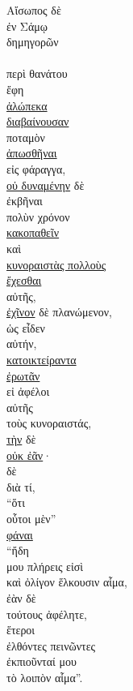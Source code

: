 {\large
\begin{greek}
\noindent Αἴσωπος δὲ \\
\tabto{2em} ἐν Σάμῳ \\
\tabto{2em} δημηγορῶν \\
 \\
\tabto{2em} περὶ θανάτου \\
ἔφη \\
\tabto{2em} \underline{ἀλώπεκα} \\
\tabto{4em} \underline{διαβαίνουσαν} \\
\tabto{6em} ποταμὸν \\
\tabto{2em} \underline{ἀπωσθῆναι} \\
\tabto{4em} εἰς φάραγγα, \\
\tabto{4em} \underline{οὐ δυναμένην} δὲ \\
\tabto{6em} ἐκβῆναι \\
\tabto{2em} πολὺν χρόνον \\
\tabto{2em} \underline{κακοπαθεῖν} \\
\tabto{2em} καὶ \\
\tabto{4em} \underline{κυνοραιστὰς πολλοὺς} \\
\tabto{2em} \underline{ἔχεσθαι} \\
\tabto{4em} αὐτῆς, \\
\tabto{2em} \underline{ἐχῖνον} δὲ πλανώμενον, \\
\tabto{4em} ὡς εἶδεν \\
\tabto{6em} αὐτήν, \\
\tabto{2em} \underline{κατοικτείραντα} \\
\tabto{2em} \underline{ἐρωτᾶν} \\
\tabto{4em} εἰ ἀφέλοι \\
\tabto{6em} αὐτῆς \\
\tabto{6em} τοὺς κυνοραιστάς, \\
\tabto{2em} \underline{τὴν} δὲ \\
\tabto{2em} \underline{οὐκ ἐᾶν}· \\
\newpage
\tabto{2em}  δὲ \\
\tabto{4em} διὰ τί, \\
\tabto{2em} ``ὅτι \\
\tabto{4em} οὗτοι μὲν'' \\
\tabto{2em} \underline{φάναι} \\
\tabto{4em} ``ἤδη \\
\tabto{4em} μου πλήρεις εἰσὶ \\
\tabto{4em} καὶ ὀλίγον ἕλκουσιν αἷμα, \\
\tabto{4em} ἐὰν δὲ \\
\tabto{6em} τούτους ἀφέλητε, \\
\tabto{4em} ἕτεροι \\
\tabto{6em} ἐλθόντες πεινῶντες \\
\tabto{4em} ἐκπιοῦνταί μου \\
\tabto{6em} τὸ λοιπὸν αἷμα''.\\

\end{greek}
}

